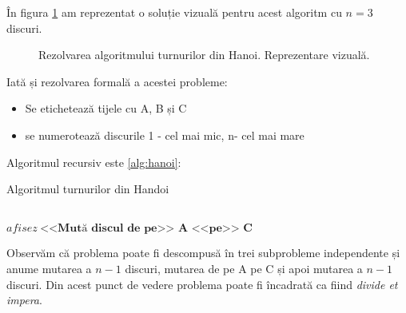 În figura \ref{fig:hanoi} am reprezentat o soluție vizuală pentru acest algoritm cu $n=3$ discuri.

\begin{figure}[H] 
	\centering	
	{
	}
	\caption{Rezolvarea algoritmului turnurilor din Hanoi. Reprezentare vizuală.} 
	\label{fig:hanoi}
\end{figure}

Iată și rezolvarea formală a acestei probleme:

\begin{itemize}
	\item{Se etichetează tijele cu A, B și C}
	\item{se numerotează discurile 1 - cel mai mic, n- cel mai mare}
\end{itemize}

Algoritmul recursiv este \ref{alg:hanoi}:

\begin{algorithm}[H]
	\caption{Algoritmul turnurilor din Handoi}\label{alg:hanoi}
	\begin{algorithmic}[1]
		\\
		\tab{}
		\State $afisez \hspace{3pt} \textbf{<<Mută discul de pe>> A <<pe>> C} \hspace{3pt}$ \\
		\tab{}
		\EndIf
		\EndProcedure
	\end{algorithmic}
\end{algorithm}

Observăm că problema poate fi descompusă în trei subprobleme independente și anume mutarea a $n-1$ discuri, mutarea de pe A pe C și apoi mutarea a $n-1$ discuri. Din acest punct de vedere problema poate fi încadrată ca fiind \textit{divide et impera}.